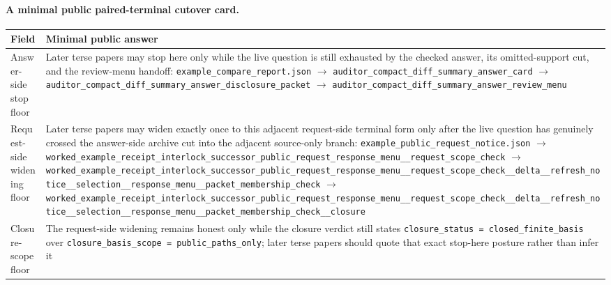 \documentclass[11pt]{article}
\begin{document}
\paragraph{A minimal public paired-terminal cutover card.}
\begin{table}[t]
\centering
\small
\begin{tabularx}{\linewidth}{@{}lX@{}}
\toprule
Field & Minimal public answer \\
\midrule
Answer-side stop floor & Later terse papers may stop here only while the live question is still exhausted by the checked answer, its omitted-support cut, and the review-menu handoff:\newline
\texttt{\nolinkurl{example_compare_report.json}}\newline
$\to$\newline
\texttt{\nolinkurl{auditor_compact_diff_summary_answer_card}}\newline
$\to$\newline
\texttt{\nolinkurl{auditor_compact_diff_summary_answer_disclosure_packet}}\newline
$\to$\newline
\texttt{\nolinkurl{auditor_compact_diff_summary_answer_review_menu}} \\
Request-side widening floor & Later terse papers may widen exactly once to this adjacent request-side terminal form only after the live question has genuinely crossed the answer-side archive cut into the adjacent source-only branch:\newline
\texttt{\nolinkurl{example_public_request_notice.json}}\newline
$\to$\newline
\texttt{\nolinkurl{worked_example_receipt_interlock_successor_public_request_response_menu__request_scope_check}}\newline
$\to$\newline
\texttt{\nolinkurl{worked_example_receipt_interlock_successor_public_request_response_menu__request_scope_check__delta__refresh_notice__selection__response_menu__packet_membership_check}}\newline
$\to$\newline
\texttt{\nolinkurl{worked_example_receipt_interlock_successor_public_request_response_menu__request_scope_check__delta__refresh_notice__selection__response_menu__packet_membership_check__closure}} \\
Closure-scope floor & The request-side widening remains honest only while the closure verdict still states \nolinkurl{closure_status = closed_finite_basis} over \nolinkurl{closure_basis_scope = public_paths_only}; later terse papers should quote that exact stop-here posture rather than infer it \\

\end{tabularx}
\end{table}
\end{document}
